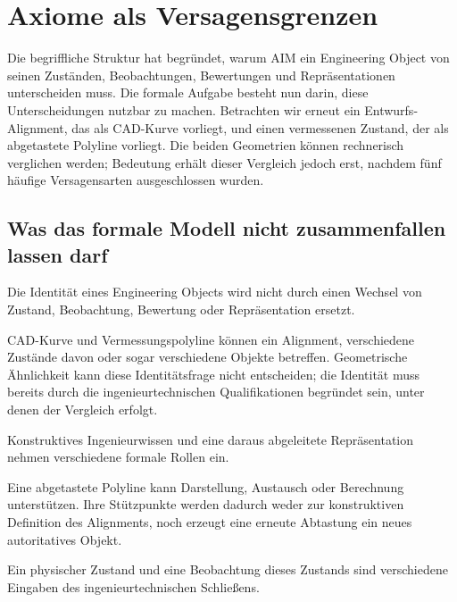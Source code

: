 
\chapter{Axiome als Versagensgrenzen}
\label{chap:axiomatic-foundation}

Die begriffliche Struktur hat begründet, warum AIM ein Engineering Object von
seinen Zuständen, Beobachtungen, Bewertungen und Repräsentationen unterscheiden
muss. Die formale Aufgabe besteht nun darin, diese Unterscheidungen nutzbar zu
machen. Betrachten wir erneut ein Entwurfs-Alignment, das als CAD-Kurve
vorliegt, und einen vermessenen Zustand, der als abgetastete Polyline vorliegt.
Die beiden Geometrien können rechnerisch verglichen werden; Bedeutung erhält
dieser Vergleich jedoch erst, nachdem fünf häufige Versagensarten
ausgeschlossen wurden.

\section{Was das formale Modell nicht zusammenfallen lassen darf}

\begin{axiom}[Objektkontinuität]
\label{ax:object-continuity}
Die Identität eines Engineering Objects wird nicht durch einen Wechsel von
Zustand, Beobachtung, Bewertung oder Repräsentation ersetzt.
\end{axiom}

CAD-Kurve und Vermessungspolyline können ein Alignment, verschiedene Zustände
davon oder sogar verschiedene Objekte betreffen. Geometrische Ähnlichkeit kann
diese Identitätsfrage nicht entscheiden; die Identität muss bereits durch die
ingenieurtechnischen Qualifikationen begründet sein, unter denen der Vergleich
erfolgt.

\begin{axiom}
\label{ax:construction-representation-separation}
Konstruktives Ingenieurwissen und eine daraus abgeleitete Repräsentation
nehmen verschiedene formale Rollen ein.
\end{axiom}

Eine abgetastete Polyline kann Darstellung, Austausch oder Berechnung
unterstützen. Ihre Stützpunkte werden dadurch weder zur konstruktiven Definition
des Alignments, noch erzeugt eine erneute Abtastung ein neues autoritatives
Objekt.

\begin{axiom}
\label{ax:reality-observation-separation}
Ein physischer Zustand und eine Beobachtung dieses Zustands sind verschiedene
Eingaben des ingenieurtechnischen Schließens.
\end{axiom}

